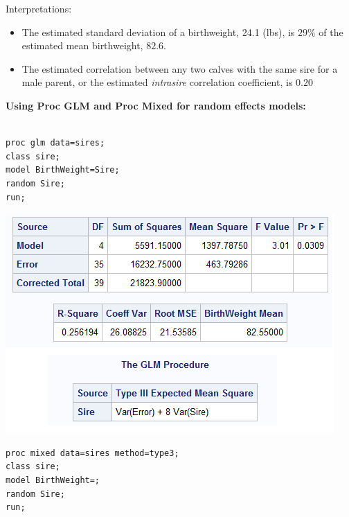 Interpretations:
\begin{itemize}
\item The estimated standard deviation of a birthweight, 24.1 (lbs), is $29\%$ of the estimated mean birthweight, $82.6$.
\item The estimated correlation between any two calves with the same sire for a male parent, or the estimated {\em intrasire} correlation
coefficient, is $0.20$
\end{itemize}

\newpage

\textbf{Using Proc GLM and Proc Mixed for random effects models:}\\~\\
\begin{small}
\begin{verbatim}
proc glm data=sires;                 
class sire;                          
model BirthWeight=Sire;              
random Sire;                         
run;                                 
\end{verbatim}
\end{small}

\begin{center}
\includegraphics[scale=0.8]{Sire1}
\end{center}

\begin{small}
\begin{verbatim}
proc mixed data=sires method=type3;                 
class sire;                          
model BirthWeight=;              
random Sire;                         
run;                                 
\end{verbatim}
\end{small}

